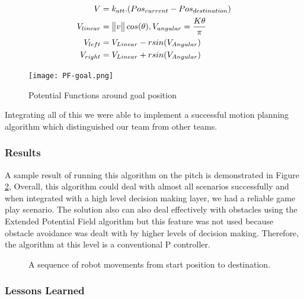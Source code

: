 \begin{align}
V & =k_{att}.(Pos_{current}-Pos_{destination})\\
V_{linear} &= \begin{Vmatrix}v\end{Vmatrix} cos(\theta) ,
V_{angular} = {K\theta \over \pi}\\
V_{left}&=V_{Linear}-rsin(V_{Angular})\\
V_{right}&=V_{Linear}+rsin(V_{Angular})
\end{align}

\begin{figure}[htp]
\begin{center}
\leavevmode
\texttt{[image: PF-goal.png]}
\end{center}
\caption{Potential Functions around goal position}
\label{fig:PFVectors}
\end{figure}

Integrating all of this we were able to implement a successful motion planning algorithm which distinguished our team from other teams.\linebreak

\subsubsection{Results}
A sample result of running this algorithm on the pitch is demonstrated in Figure \ref{fig:seq}, Overall, this algorithm could deal with almost all scenarios successfully and when integrated with a high level decision making layer, we had a reliable game play scenario. 
The solution also can also deal effectively with obstacles using the Extended Potential Field algorithm\cite{paper:OKhatib} but this feature was not used because obstacle avoidance was dealt with by higher levels of decision making. Therefore, the algorithm at this level is a conventional P controller. \linebreak


\begin{figure}[!bp]
\begin{center}
\caption{A sequence of robot movements from start position to destination.}
\label{fig:seq}
\end{center}
\end{figure}

\subsubsection{Lessons Learned}

